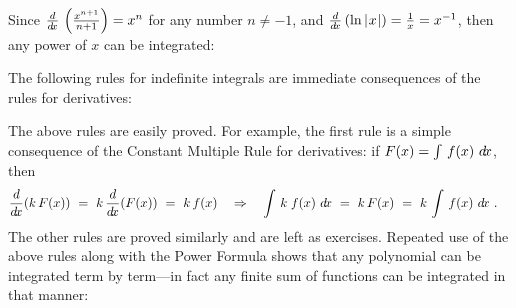 Since $\frac{d}{d\!x}\,\left(\frac{x^{n+1}}{n+1}\right) = x^n$ for any number $n \ne -1$,
and $\frac{d}{d\!x}\,(\ln\,\lvert\mspace{1mu}x\mspace{1mu}\rvert) = \frac{1}{x} = x^{-1}$, then any power of $x$ can be
integrated:
\newpage
{}

The following rules for indefinite integrals are immediate consequences of
the rules for derivatives:


The above rules are easily proved. For example, the first rule is a simple
consequence of the Constant Multiple Rule for derivatives: if $F(x) =
\int\,f(x)~d\!x$, then
\[
\frac{d}{d\!x}(k\,F(x)) ~=~ k\,\frac{d}{d\!x}(F(x)) ~=~ k\,f(x) \quad\Rightarrow\quad
\int\,k\;f(x)~d\!x ~=~ k\,F(x) ~=~ k\,\int\,f(x)~d\!x ~.\quad\relax
\]
The other rules are proved similarly and are left as exercises.
Repeated use of the above rules along with the Power Formula shows that
any polynomial can be integrated term by term---in fact any finite sum
of functions can be integrated in that manner:



